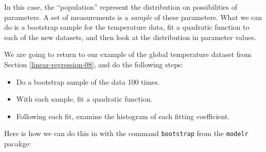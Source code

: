 \documentclass[
]{book}
\newenvironment{Shaded}{\begin{snugshade}}{\end{snugshade}}
\newcommand{\AttributeTok}[1]{\textcolor[rgb]{0.77,0.63,0.00}{#1}}
\newcommand{\CommentTok}[1]{\textcolor[rgb]{0.56,0.35,0.01}{\textit{#1}}}
\newcommand{\DecValTok}[1]{\textcolor[rgb]{0.00,0.00,0.81}{#1}}
\newcommand{\FunctionTok}[1]{\textcolor[rgb]{0.00,0.00,0.00}{#1}}
\newcommand{\NormalTok}[1]{#1}
\newcommand{\OtherTok}[1]{\textcolor[rgb]{0.56,0.35,0.01}{#1}}
\newcommand{\SpecialCharTok}[1]{\textcolor[rgb]{0.00,0.00,0.00}{#1}}
\newcommand{\StringTok}[1]{\textcolor[rgb]{0.31,0.60,0.02}{#1}}
\providecommand{\tightlist}{%
  \setlength{\itemsep}{0pt}\setlength{\parskip}{0pt}}
\theoremstyle{definition}
\theoremstyle{definition}
\theoremstyle{definition}
\theoremstyle{remark}
\begin{document}
In this case, the ``population'' represent the distribution on possibilities of parameters. A set of measurements is a \emph{sample} of these parameters. What we can do is a bootstrap sample for the temperature data, fit a quadratic function to each of the new datasets, and then look at the distribution in parameter values.

We are going to return to our example of the global temperature dataset from Section \ref{linear-regression-08}, and do the following steps:

\begin{itemize}
\tightlist
\item
  Do a bootstrap sample of the data 100 times.
\item
  With each sample, fit a quadratic function.
\item
  Following each fit, examine the histogram of each fitting coefficient.
\end{itemize}

Here is how we can do this in with the command \texttt{bootstrap} from the \texttt{modelr} pacakge:

\begin{Shaded}
\end{Shaded}
\end{document}
